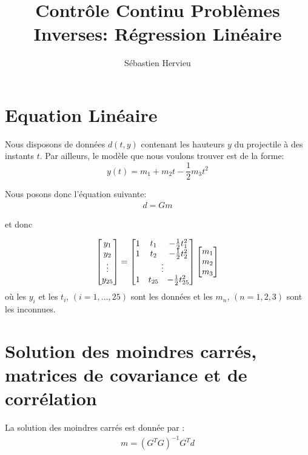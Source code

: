\documentclass[12pt,a4paper]{extreport}
\author{Sébastien Hervieu}
\title{Contrôle Continu Problèmes Inverses: Régression Linéaire}
\begin{document}
\maketitle

\section{Equation Linéaire}

Nous disposons de données $d(t,y)$ contenant les hauteurs $y$ du projectile à des instants $t$.
Par ailleurs, le modèle que nous voulons trouver est de la forme:
\[y(t)=m_1+m_2t-\frac{1}{2}m_3t^2\]

Nous posons donc l'équation suivante:
\begin{gather}
d = Gm
\end{gather}

et donc 

\begin{gather}
	\begin{bmatrix} y_1 \\ y_2 \\ \vdots \\ y_{25} \end{bmatrix}
	=
	\begin{bmatrix}
	1 & t_1 & -\frac{1}{2}t_1^2 \\
	1 & t_2 & -\frac{1}{2}t_2^2 \\ 
	\multicolumn{3}{c}{$\vdots$} \\
	1 & t_{25} & -\frac{1}{2}t_{25}^2
	\end{bmatrix}
	\begin{bmatrix} m_1 \\ m_2 \\ m_3 \end{bmatrix}
\end{gather}
où les $y_i$ et les $t_i$, $(i= 1, \dots, 25)$  sont les données et les $m_n$, $(n =1, 2, 3)$ sont les inconnues.


\section{Solution des moindres carrés, matrices de covariance et de corrélation}

La solution des moindres carrés est donnée par :
\begin{equation}
	\begin{gathered}
		m = (G^TG)^{-1}G^Td
	\end{gathered}\label{eq:1}
\end{equation}
\end{document}
